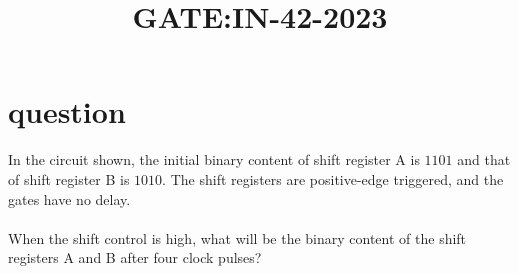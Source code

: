 \documentclass[journal,12pt,onecolumn]{IEEEtran}
\theoremstyle{remark}
\begin{document}

\vspace{3cm}

\title{GATE:IN-42-2023}
\maketitle
\bigskip



\section{question}
In the circuit shown, the initial binary content of shift register A is $1101$ and that of shift register B is $1010$. The shift registers are positive-edge triggered, and the gates have no delay.\\
\\
When the shift control is high, what will be the binary content of the shift registers A and B after four clock pulses?\\
\end{document}
